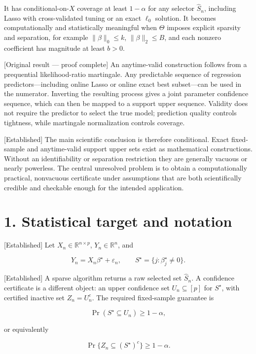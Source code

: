 \documentclass[
  english,
  11pt,
  a4paper,
]{article}
\begin{document}
It has conditional-on-$X$ coverage at least $1-\alpha$ for any
selector $\widehat S_n$, including Lasso with cross-validated tuning
or an exact $\ell_0$ solution. It becomes computationally and
statistically meaningful when $\Theta$ imposes explicit sparsity and
separation, for example $\lVert\beta\rVert_0\le k$,
$\lVert\beta\rVert_2\le B$, and each nonzero coefficient has magnitude
at least $b>0$.

{[}Original result --- proof complete{]} An anytime-valid construction
follows from a prequential likelihood-ratio martingale. Any predictable
sequence of regression predictors---including online Lasso or online
exact best subset---can be used in the numerator. Inverting the
resulting process gives a joint parameter confidence sequence, which can
then be mapped to a support upper sequence. Validity does not require
the predictor to select the true model; prediction quality controls
tightness, while martingale normalization controls coverage.

{[}Established{]} The main scientific conclusion is therefore
conditional. Exact fixed-sample and anytime-valid support upper sets
exist as mathematical constructions. Without an identifiability or
separation restriction they are generally vacuous or nearly powerless.
The central unresolved problem is to obtain a computationally practical,
nonvacuous certificate under assumptions that are both scientifically
credible and checkable enough for the intended application.

\section{1. Statistical target and
notation}\label{statistical-target-and-notation}

{[}Established{]} Let $X_n\in\mathbb R^{n\times p}$,
$Y_n\in\mathbb R^n$, and

$$
Y_n=X_n\beta^\star+\varepsilon_n,
\qquad
S^\star=\{j:\beta_j^\star\ne0\}.
$$

{[}Established{]} A sparse algorithm returns a raw selected set
$\widehat S_n$. A confidence certificate is a different object: an
upper confidence set $U_n\subseteq[p]$ for $S^\star$, with certified
inactive set $Z_n=U_n^c$. The required fixed-sample guarantee is

$$
\Pr(S^\star\subseteq U_n)\ge1-\alpha,
$$

or equivalently

$$
\Pr\{Z_n\subseteq(S^\star)^c\}\ge1-\alpha.
$$
\end{document}
